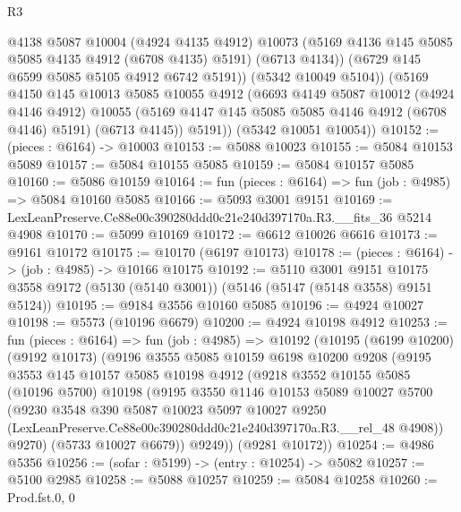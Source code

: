 \begin{lexlean}{R3}
\begin{coremodule}
              @4138
              @5087
              @10004
              (@4924 @4135 @4912)
              @10073
              (@5169 @4136 @145 @5085 @5085 @4135 @4912 (@6708 @4135) @5191)
              (@6713 @4134))
            (@6729 @145 @6599 @5085 @5105 @4912 @6742 @5191))
          (@5342 @10049 @5104))
        (@5169
          @4150
          @145
          @10013
          @5085
          @10055
          @4912
          (@6693
            @4149
            @5087
            @10012
            (@4924 @4146 @4912)
            @10055
            (@5169 @4147 @145 @5085 @5085 @4146 @4912 (@6708 @4146) @5191)
            (@6713 @4145))
          @5191))
      (@5342 @10051 @10054))
@10152 := (pieces : @6164) -> @10003
@10153 := @5088 @10023
@10155 := @5084 @10153 @5089
@10157 := @5084 @10155 @5085
@10159 := @5084 @10157 @5085
@10160 := @5086 @10159
@10164 := fun (pieces : @6164) => fun (job : @4985) => @5084 @10160 @5085
@10166 := @5093 @3001 @9151
@10169 := LexLeanPreserve.Ce88e00c390280ddd0c21e240d397170a.R3.__fits_36 @5214 @4908
@10170 := @5099 @10169
@10172 := @6612 @10026 @6616
@10173 := @9161 @10172
@10175 := @10170 (@6197 @10173)
@10178 := (pieces : @6164) -> (job : @4985) -> @10166 @10175
@10192 := @5110
    @3001
    @9151
    @10175
    @3558
    @9172
    (@5130 (@5140 @3001))
    (@5146 (@5147 (@5148 @3558) @9151 @5124))
@10195 := @9184 @3556 @10160 @5085
@10196 := @4924 @10027
@10198 := @5573 (@10196 @6679)
@10200 := @4924 @10198 @4912
@10253 := fun (pieces : @6164) =>
  fun (job : @4985) =>
  @10192
    (@10195
      (@6199 @10200)
      (@9192 @10173)
      (@9196
        @3555
        @5085
        @10159
        @6198
        @10200
        @9208
        (@9195
          @3553
          @145
          @10157
          @5085
          @10198
          @4912
          (@9218
            @3552
            @10155
            @5085
            (@10196 @5700)
            @10198
            (@9195
              @3550
              @1146
              @10153
              @5089
              @10027
              @5700
              (@9230
                @3548
                @390
                @5087
                @10023
                @5097
                @10027
                @9250
                (LexLeanPreserve.Ce88e00c390280ddd0c21e240d397170a.R3.__rel_48 @4908))
              @9270)
            (@5733 @10027 @6679))
          @9249))
      (@9281 @10172))
@10254 := @4986 @5356
@10256 := (sofar : @5199) -> (entry : @10254) -> @5082
@10257 := @5100 @2985
@10258 := @5088 @10257
@10259 := @5084 @10258
@10260 := Prod.fst.{0, 0}

\end{coremodule}
\end{lexlean}
